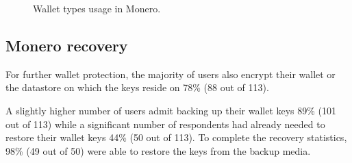 \documentclass[
  printed, %
  table,   %
  lof,     %
  lot,     %
           oneside, color
]{fithesis3}
\begin{document}
\begin{center}
\begin{figure}[H]
\caption{Wallet types usage in Monero.}
\label{chart:monerowalletsusagechart}\end{figure}\end{center}

\subsection{Monero recovery}
For further wallet protection, the majority of users also encrypt their wallet or the datastore on which the keys reside on 78\% (88 out of 113).

A slightly higher number of users admit backing up their wallet keys 89\% (101 out of 113) while a significant number of respondents had already needed to restore their wallet keys 44\% (50 out of 113). To complete the recovery statistics, 98\% (49 out of 50) were able to restore the keys from the backup media.
\end{document}
